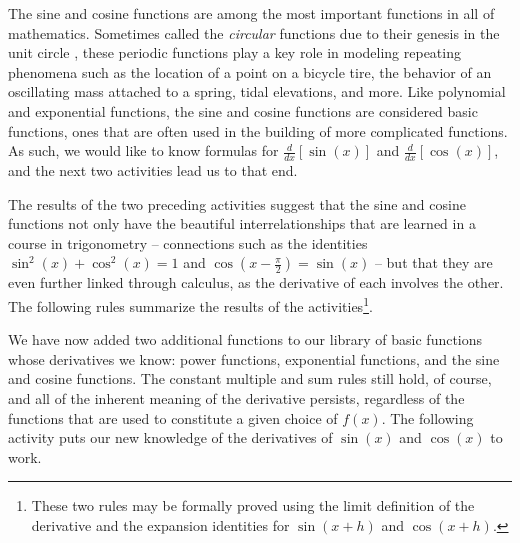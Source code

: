 The sine and cosine functions are among the most important functions in all of mathematics.  Sometimes called the \emph{circular} functions due to their genesis in the unit circle%
, these periodic functions play a key role in modeling repeating phenomena such as the location of a point on a bicycle tire, the behavior of an oscillating mass attached to a spring, tidal elevations, and more.  Like polynomial and exponential functions, the sine and cosine functions are considered basic functions, ones that are often used in the building of more complicated functions.  As such, we would like to know formulas for $\frac{d}{dx} [\sin(x)]$ and $\frac{d}{dx} [\cos(x)]$, and the next two activities lead us to that end.





The results of the two preceding activities suggest that the sine and cosine functions not only have the beautiful interrelationships that are learned in a course in trigonometry -- connections such as the identities $\sin^2(x) + \cos^2(x) = 1$ and $\cos(x - \frac{\pi}{2}) = \sin(x)$ -- but that they are even further linked through calculus, as the derivative of each involves the other.  The following rules summarize the results of the activities\footnote{These two rules may be formally proved using the limit definition of the derivative and the expansion identities for $\sin(x+h)$ and $\cos(x+h)$.}.

\vspace*{5pt}
\nin {}
\vspace*{1pt}

We have now added two additional functions to our library of basic functions whose derivatives we know: power functions, exponential functions, and the sine and cosine functions.  The constant multiple and sum rules still hold, of course, and all of the inherent meaning of the derivative persists, regardless of the functions that are used to constitute a given choice of $f(x)$.  The following activity puts our new knowledge of the derivatives of $\sin(x)$ and $\cos(x)$ to work.


